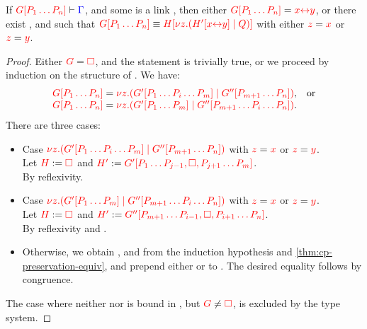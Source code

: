 \begin{lemmaB}\label{thm:cp-progress-link}
  If $\seq[{ \cpPlug{G}{P_1 \dots P_n} }]{ \Gamma }$, and some  is a
  link , then either $\tm{\cpPlug{G}{P_1 \dots P_n}} =
  \tm{\cpLink{x}{y}}$, or there exist ,  and  such that
  \(
  \tm{\cpPlug{G}{P_1 \dots P_n}} \equiv
  \tm{\cpPlug{H}{\cpCut{z}{\cpPlug{H'}{\cpLink{x}{y}}}{Q}}}
  \)
  with either $\tm{z} = \tm{x}$ or $\tm{z} = \tm{y}$.
\end{lemmaB}
  \begin{proof}
    Either $\tm{G} = \tm{\Box}$, and the statement is trivially true, or we
    proceed by induction on the structure of . We have:
    \begin{gather*}
      \begin{array}[t]{ll}
        \tm{\cpPlug{G}{P_1 \dots P_n}} = \tm{\cpCut{z}{\cpPlug{G'}{P_1\dots P_i\dots P_m}}{\cpPlug{G''}{P_{m+1}\dots P_n}}},&\text{or}
        \\
        \tm{\cpPlug{G}{P_1 \dots P_n}} = \tm{\cpCut{z}{\cpPlug{G'}{P_1\dots P_m}}{\cpPlug{G''}{P_{m+1}\dots P_i\dots P_n}}}. 
      \end{array}
    \end{gather*}
    There are three cases:
    \begin{itemize}
    \item
      Case $\tm{\cpCut{z}{\cpPlug{G'}{P_1\dots P_i\dots P_m}}{\cpPlug{G''}{P_{m+1}\dots P_n}}}$
      with $\tm{z} = \tm{x}$ or $\tm{z} = \tm{y}$.
      \\
      Let $\tm{H} := \tm{\Box}$ and $\tm{H'} := \tm{\cpPlug{G'}{P_1\dots P_{j-1},\Box,P_{j+1}\dots P_m}}$.
      \\[1ex]
      By reflexivity.
    \item
      Case $\tm{\cpCut{z}{\cpPlug{G'}{P_1\dots P_m}}{\cpPlug{G''}{P_{m+1}\dots P_i\dots P_n}}}$
      with $\tm{z} = \tm{x}$ or $\tm{z} = \tm{y}$.
      \\
      Let $\tm{H} := \tm{\Box}$ and $\tm{H'} := \tm{\cpPlug{G''}{P_{m+1}\dots P_{i-1},\Box,P_{i+1}\dots P_n}}$.
      \\
      By reflexivity and \cpEquivCutComm.
    \item
      Otherwise, we obtain ,  and  from the induction
      hypothesis and \cref{thm:cp-preservation-equiv}, and prepend either
       or
       to .
      The desired equality follows by congruence.
    \end{itemize}
    The case where neither  nor  is bound in , but $\tm{G} \neq
    \tm{\Box}$, is excluded by the type system.
  \end{proof}
